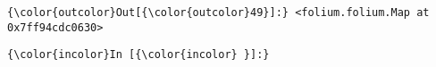 \documentclass[11pt]{article}
\begin{document}
            \begin{Verbatim}[commandchars=\\\{\}]
{\color{outcolor}Out[{\color{outcolor}49}]:} <folium.folium.Map at 0x7ff94cdc0630>
\end{Verbatim}
        
    \begin{Verbatim}[commandchars=\\\{\}]
{\color{incolor}In [{\color{incolor} }]:} 
\end{Verbatim}


    
    
    
    
\end{document}
